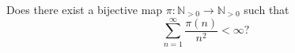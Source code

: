 \begin{problem}
    Does there exist a bijective map \( \pi \colon \mathbb{N}_{>0} \to \mathbb{N}_{>0} \) such that
    \[
        \sum_{n=1}^{\infty} \frac{\pi\left(n\right)}{n^2} < \infty?
    \]
\end{problem}
